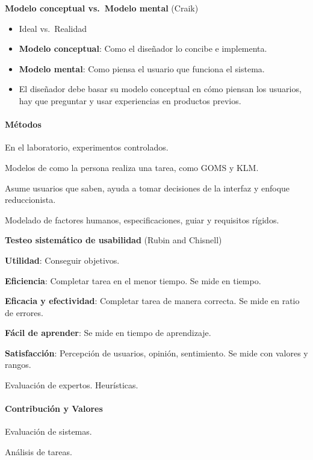 \documentclass[12pt]{report} %
\begin{document}
\textbf{Modelo conceptual vs.~Modelo mental} (Craik)

\begin{itemize}
\item
  Ideal vs.~Realidad
\item
  \textbf{Modelo conceptual}: Como el diseñador lo concibe e implementa.
\item
  \textbf{Modelo mental}: Como piensa el usuario que funciona el
  sistema.
\item
  El diseñador debe basar su modelo conceptual en cómo piensan los
  usuarios, hay que preguntar y usar experiencias en productos previos.
\end{itemize}

\hypertarget{muxe9todos}{%
\paragraph{Métodos}\label{muxe9todos}}

En el laboratorio, experimentos controlados.

Modelos de como la persona realiza una tarea, como GOMS y KLM.

Asume usuarios que saben, ayuda a tomar decisiones de la interfaz y
enfoque reduccionista.

Modelado de factores humanos, especificaciones, guiar y requisitos
rígidos.

\textbf{Testeo sistemático de usabilidad} (Rubin and Chisnell)

\textbf{Utilidad}: Conseguir objetivos.

\textbf{Eficiencia}: Completar tarea en el menor tiempo. Se mide en
tiempo.

\textbf{Eficacia y efectividad}: Completar tarea de manera correcta. Se
mide en ratio de errores.

\textbf{Fácil de aprender}: Se mide en tiempo de aprendizaje.

\textbf{Satisfacción}: Percepción de usuarios, opinión, sentimiento. Se
mide con valores y rangos.

Evaluación de expertos. Heurísticas.

\hypertarget{contribuciuxf3n-y-valores}{%
\paragraph{Contribución y Valores}\label{contribuciuxf3n-y-valores}}

Evaluación de sistemas.

Análisis de tareas.
\end{document}

